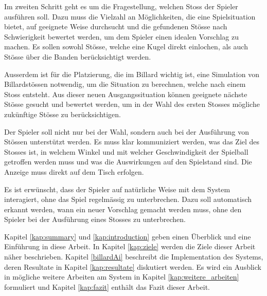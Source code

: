 Im zweiten Schritt geht es um die Fragestellung, welchen Stoss der Spieler ausführen soll.
Dazu muss die Vielzahl an Möglichkeiten, die eine Spielsituation bietet, auf geeignete Weise durchsucht und die gefundenen
Stösse nach Schwierigkeit bewertet werden, um dem Spieler einen idealen Vorschlag zu machen.
Es sollen sowohl Stösse, welche eine Kugel direkt einlochen, als auch Stösse über die Banden berücksichtigt werden.

Ausserdem ist für die Platzierung, die im Billard wichtig ist, eine Simulation von Billardstössen notwendig,
um die Situation zu berechnen, welche nach einem Stoss entsteht.
Aus dieser neuen Ausgangssituation können geeignete nächste Stösse gesucht und bewertet werden, um in der Wahl des
ersten Stosses mögliche zukünftige Stösse zu berücksichtigen.

Der Spieler soll nicht nur bei der Wahl, sondern auch bei der Ausführung von Stössen unterstützt werden.
Es muss klar kommuniziert werden, was das Ziel des Stosses ist, in welchem Winkel und mit welcher Geschwindigkeit
der Spielball getroffen werden muss und was die Auswirkungen auf den Spielstand sind.
Die Anzeige muss direkt auf dem Tisch erfolgen.

Es ist erwünscht, dass der Spieler auf natürliche Weise mit dem System interagiert, ohne das Spiel regelmässig zu unterbrechen.
Dazu soll automatisch erkannt werden, wann ein neuer Vorschlag gemacht werden muss, ohne den Spieler bei der Ausführung
eines Stosses zu unterbrechen.

Kapitel \ref{kap:summary} und \ref{kap:introduction} geben einen Überblick und eine Einführung in diese Arbeit.
In Kapitel \ref{kap:ziele} werden die Ziele dieser Arbeit näher beschrieben.
Kapitel \ref{billardAi} beschreibt die Implementation des Systems, deren Resultate in Kapitel \ref{kap:resultate}
diskutiert werden.
Es wird ein Ausblick in mögliche weitere Arbeiten am System in Kapitel \ref{kap:weitere_arbeiten} formuliert und
Kapitel \ref{kap:fazit} enthält das Fazit dieser Arbeit.
